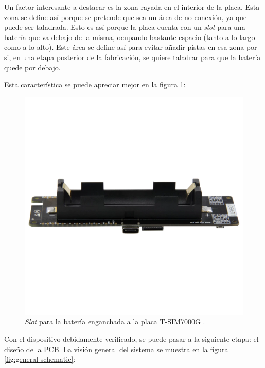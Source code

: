 Un factor interesante a destacar es la zona rayada en el interior de la placa. Esta
zona se define así porque se pretende que sea un área de no conexión, ya que puede
ser taladrada. Esto es así porque la placa cuenta con un \textit{slot} para una
batería que va debajo de la misma, ocupando bastante espacio (tanto a lo largo como
a lo alto). Este área se define así para evitar añadir pistas en esa zona por si,
en una etapa posterior de la fabricación, se quiere taladrar para que la batería
quede por debajo.

Esta característica se puede apreciar mejor en la figura \ref{fig:tsim-battery}:

\begin{figure}[H]
  \centering
  \includegraphics[width=\linewidth]{images/tsim-battery.png}
  \caption{\textit{Slot} para la batería enganchada a la placa T-SIM7000G \cite{4269LILYGO}.}
  \label{fig:tsim-battery}
\end{figure}

Con el dispositivo debidamente verificado, se puede pasar a la siguiente etapa: el
diseño de la PCB. La visión general del sistema se muestra en la figura \ref{fig:general-schematic}:

